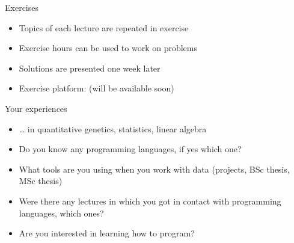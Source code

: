 \documentclass[ignorenonframetext,]{beamer}
\providecommand{\tightlist}{%
  \setlength{\itemsep}{0pt}\setlength{\parskip}{0pt}}
\begin{document}
\begin{frame}{Exercises}
\protect\hypertarget{exercises}{}

\begin{itemize}
\tightlist
\item
  Topics of each lecture are repeated in exercise
\item
  Exercise hours can be used to work on problems
\item
  Solutions are presented one week later
\item
  Exercise platform: (will be available soon)
\end{itemize}


\end{frame}

\begin{frame}{Your experiences}
\protect\hypertarget{your-experiences}{}

\begin{itemize}
\tightlist
\item
  \ldots{} in quantitative genetics, statistics, linear algebra
\item
  Do you know any programming languages, if yes which one?
\item
  What tools are you using when you work with data (projects, BSc
  thesis, MSc thesis)
\item
  Were there any lectures in which you got in contact with programming
  languages, which ones?
\item
  Are you interested in learning how to program?
\end{itemize}


\end{frame}
\end{document}
